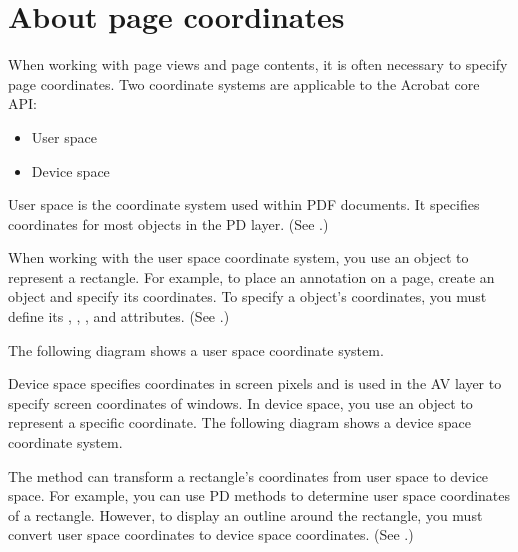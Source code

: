 \documentclass[letterpaper,12pt,english,openany,oneside]{sphinxmanual}
\begin{document}
\section{About page coordinates}
\label{\detokenize{Plugins_Pages:about-page-coordinates}}
When working with page views and page contents, it is often necessary to specify page coordinates. Two coordinate systems are applicable to the Acrobat core API:
\begin{itemize}
\item {} 
User space

\item {} 
Device space

\end{itemize}

User space is the coordinate system used within PDF documents. It specifies coordinates for most objects in the PD layer. (See .)

When working with the user space coordinate system, you use an  object to represent a rectangle. For example, to place an annotation on a page, create an  object and specify its coordinates. To specify a  object’s coordinates, you must define its , , , and  attributes. (See .)

The following diagram shows a user space coordinate system.

\noindent{}

Device space specifies coordinates in screen pixels and is used in the AV layer to specify screen coordinates of windows. In device space, you use an  object to represent a specific coordinate. The following diagram shows a device space coordinate system.

\noindent{}

The  method can transform a rectangle’s coordinates from user space to device space. For example, you can use PD methods to determine user space coordinates of a rectangle. However, to display an outline around the rectangle, you must convert user space coordinates to device space coordinates. (See .)
\end{document}
